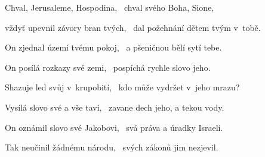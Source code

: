 \begin{psalmus}

Chval, Jerusaleme, Hospodina,~\grestar{}
chval svého Boha, Sione,~\Abardot{}

vždyť upevnil závory bran tvých,~\grestar{}
dal požehnání dětem tvým v tobě.~\Abardot{}

On zjednal území tvému pokoj,~\grestar{}
a pšeničnou bělí sytí tebe.~\Abardot{}

On posílá rozkazy své zemi,~\grestar{}
pospíchá rychle slovo jeho.~\Abardot{}

Shazuje led svůj v krupobití,~\grestar{}
kdo může vydržet v jeho mrazu?~\Abardot{}

Vysílá slovo své a vše taví,~\grestar{}
zavane dech jeho, a tekou vody.~\Abardot{}

On oznámil slovo své Jakobovi,~\grestar{}
svá práva a úradky Israeli.~\Abardot{}

Tak neučinil žádnému národu,~\grestar{}
svých zákonů jim nezjevil.~\Abardot{}
\end{psalmus}

